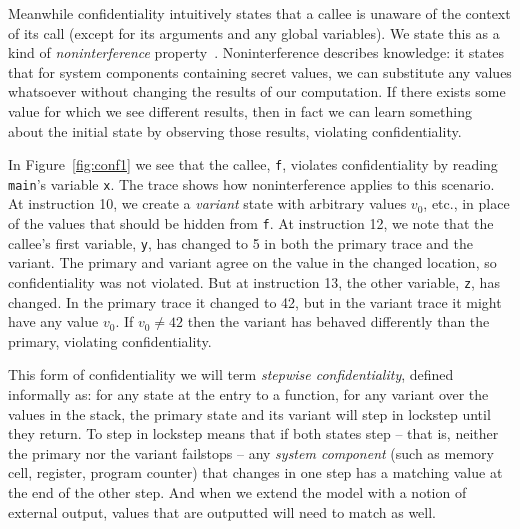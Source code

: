 \documentclass[acmsmall,review,anonymous]{acmart}\settopmatter{printfolios=true,printccs=false,printacmref=false}
\begin{document}
Meanwhile confidentiality intuitively states that a callee is unaware
of the context of its call (except for its arguments and any global
variables).
We state this as a kind of {\em noninterference} property~\citep{??}.
Noninterference describes knowledge: it states that for system components
containing secret values, we can substitute any values whatsoever without changing the results
of our computation. If there exists some value for which we see different results, then
in fact we can learn something about the initial state by observing those results, violating
confidentiality.

In Figure~\ref{fig:conf1} we see that the callee, {\tt f}, violates confidentiality
by reading {\tt main}'s variable {\tt x}. The trace
shows how noninterference applies to this scenario. At instruction 10, we create a {\em variant}
state with arbitrary values \(v_0\), etc., in place of the values that should
be hidden from {\tt f}. At instruction 12, we note that the callee's first variable, {\tt y}, has
changed to 5 in both the primary trace and the variant. The primary and variant agree on
the value in the changed location, so confidentiality was not violated. But at instruction 13,
the other variable, {\tt z}, has changed. In the primary trace it changed to 42, but
in the variant trace it might have any value \(v_0\). If \(v_0 \neq 42\) then the variant
has behaved differently than the primary, violating confidentiality.

This form of confidentiality we will term {\em stepwise confidentiality}, defined informally
as: for any state at the entry to a function, for any variant over the values in the stack,
the primary state and its variant will step in lockstep until they return. To step in lockstep
means that if both states step -- that is, neither the primary nor the variant failstops --
any {\em system component} (such as memory cell, register, program counter) that changes
in one step has a matching value at the end of the other step. And when we
extend the model with a notion of external output, values that are outputted will need
to match as well.

\end{document}
